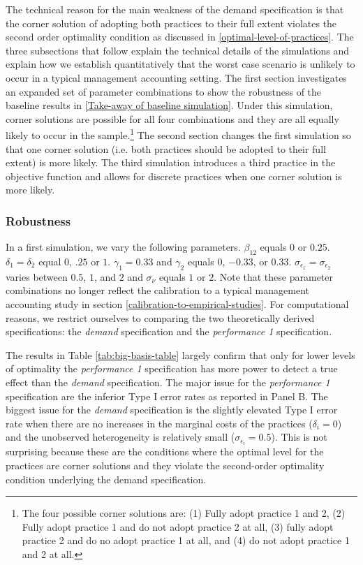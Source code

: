 \documentclass[12pt]{article}
\begin{document}
The technical reason for the main weakness of the demand specification is that the corner solution of adopting both practices to their full extent violates the second order optimality condition as discussed in \ref{optimal-level-of-practices}. The three subsections that follow explain the technical details of the simulations and explain how we establish quantitatively that the worst case scenario is unlikely to occur in a typical management accounting setting. The first section investigates an expanded set of parameter combinations to show the robustness of the baseline results in \ref{Take-away of baseline simulation}. Under this simulation, corner solutions are possible for all four combinations and they are all equally likely to occur in the sample.\footnote{The four possible corner solutions are: (1) Fully adopt practice 1 and 2, (2) Fully adopt practice 1 and do not adopt practice 2 at all, (3) fully adopt practice 2 and do no adopt practice 1 at all, and (4) do not adopt practice 1 and 2 at all.} The second section changes the first simulation so that one corner solution (i.e. both practices should be adopted to their full extent) is more likely. The third simulation introduces a third practice in the objective function and allows for discrete practices when one corner solution is more likely. 

\subsubsection{Robustness}

In a first simulation, we vary the following parameters. $\beta_{12}$ equals $0$ or $0.25$. $\delta_1 = \delta_2$ equal $0$, $.25$ or $1$. $\gamma_1 = 0.33$ and $\gamma_2$ equals $0$, $-0.33$, or $0.33$. $\sigma_{\epsilon_1} = \sigma_{\epsilon_2}$ varies between $0.5$, $1$, and $2$ and $\sigma_{\nu}$ equals $1$ or $2$. Note that these parameter combinations no longer reflect the calibration to a typical management accounting study in section \ref{calibration-to-empirical-studies}. For computational reasons, we restrict ourselves to comparing the two theoretically derived specifications: the \emph{demand} specification and the \emph{performance 1} specification.



The results in Table \ref{tab:big-basis-table} largely confirm that only for lower levels of optimality the \emph{performance 1} specification has more power to detect a true effect than the \emph{demand} specification. The major issue for the \emph{performance 1} specification are the inferior Type I error rates as reported in Panel B. The biggest issue for the \emph{demand} specification is the slightly elevated Type I error rate when there are no increases in the marginal costs of the practices ($\delta_i = 0$) and the unobserved heterogeneity is relatively small ($\sigma_{\epsilon_i} = 0.5$). This is not surprising because these are the conditions where the optimal level for the practices are corner solutions and they violate the second-order optimality condition underlying the demand specification.
\end{document}
